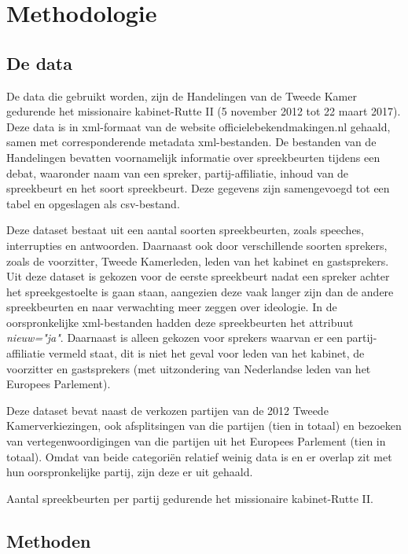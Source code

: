 \section{Methodologie}
\label{sec:meth}


\subsection{De data}
De data die gebruikt worden, zijn de Handelingen van de Tweede Kamer gedurende het missionaire kabinet-Rutte II (5 november 2012 tot 22 maart 2017). Deze data is in xml-formaat van de website officielebekendmakingen.nl gehaald, samen met corresponderende metadata xml-bestanden. De bestanden van de Handelingen bevatten voornamelijk informatie over spreekbeurten tijdens een debat, waaronder naam van een spreker, partij-affiliatie, inhoud van de spreekbeurt en het soort spreekbeurt. Deze gegevens zijn samengevoegd tot een tabel en opgeslagen als csv-bestand.\par
Deze dataset bestaat uit een aantal soorten spreekbeurten, zoals speeches, interrupties en antwoorden. Daarnaast ook door verschillende soorten sprekers, zoals de voorzitter, Tweede Kamerleden, leden van het kabinet en gastsprekers. Uit deze dataset is gekozen voor de eerste spreekbeurt nadat een spreker achter het spreekgestoelte is gaan staan, aangezien deze vaak langer zijn dan de andere spreekbeurten en naar verwachting meer zeggen over ideologie. In de oorspronkelijke xml-bestanden hadden deze spreekbeurten het attribuut \textit{nieuw="ja"}.  Daarnaast is alleen gekozen voor sprekers waarvan er een partij-affiliatie vermeld staat, dit is niet het geval voor leden van het kabinet, de voorzitter en gastsprekers  (met uitzondering van Nederlandse leden van het Europees Parlement).\par
Deze dataset bevat naast de verkozen partijen van de 2012 Tweede Kamerverkiezingen, ook afsplitsingen van die partijen (tien in totaal) en bezoeken van vertegenwoordigingen van die partijen uit het Europees Parlement (tien in totaal). Omdat van beide categori\"{e}n relatief weinig data is en er overlap zit met hun oorspronkelijke partij, zijn deze er uit gehaald.
\begin{table}[H]
\caption{Aantal spreekbeurten per partij gedurende het missionaire kabinet-Rutte II.}
\centering

\end{table}




\pagebreak
\subsection{Methoden}


